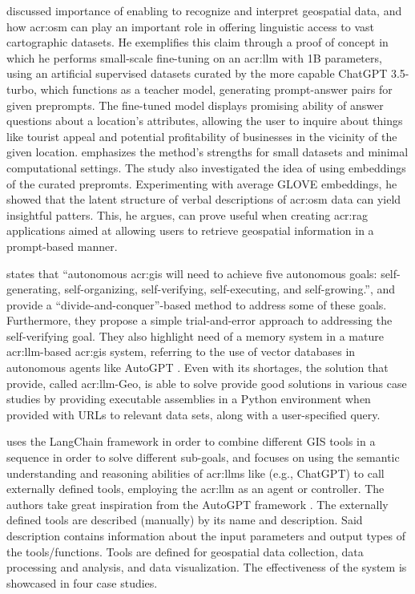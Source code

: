\cite{unluChatmapLargeLanguage2023} discussed importance of enabling  to recognize and interpret geospatial data, and how \gls{acr:osm} can play an important role in offering  linguistic access to vast cartographic datasets. He exemplifies this claim through a proof of concept in which he performs small-scale fine-tuning on an \acrshort{acr:llm} with 1B parameters, using an artificial supervised datasets curated by the more capable ChatGPT 3.5-turbo, which functions as a teacher model, generating prompt-answer pairs for given preprompts. The fine-tuned model displays promising ability of answer questions about a location's attributes, allowing the user to inquire about things like tourist appeal and potential profitability of businesses in the vicinity of the given location. \citeauthor{unluChatmapLargeLanguage2023} emphasizes the method's strengths for small datasets and minimal computational settings. The study also investigated the idea of using embeddings of the curated prepromts. Experimenting with average GLOVE embeddings, he showed that the latent structure of verbal descriptions of \gls{acr:osm} data can yield insightful patters. This, he argues, can prove useful when creating \acrfull{acr:rag} applications aimed at allowing users to retrieve geospatial information in a prompt-based manner.

\cite{liAutonomousGISNextgeneration2023} states that “autonomous \acrshort{acr:gis} will need to achieve five autonomous goals: self-generating, self-organizing, self-verifying, self-executing, and self-growing.”, and provide a “divide-and-conquer”-based method to address some of these goals. Furthermore, they propose a simple trial-and-error approach to addressing the self-verifying goal. They also highlight need of a memory system in a mature \gls{acr:llm}-based \gls{acr:gis} system, referring to the use of vector databases in autonomous agents like AutoGPT \citep{richardAutoGPTHeartOpensource2023}. Even with its shortages, the solution that \citep{liAutonomousGISNextgeneration2023} provide, called \acrshort{acr:llm}-Geo, is able to solve provide good solutions in various case studies by providing executable assemblies in a Python environment when provided with URLs to relevant data sets, along with a user-specified query.

\cite{zhangGeoGPTUnderstandingProcessing2023} uses the LangChain framework \citep{chaseLangChain2022} in order to combine different GIS tools in a sequence in order to solve different sub-goals, and focuses on using the semantic understanding and reasoning abilities of \glspl{acr:llm} like (e.g., ChatGPT) to call externally defined tools, employing the \gls{acr:llm} as an agent or controller. The authors take great inspiration from the AutoGPT framework \citep{richardAutoGPTHeartOpensource2023}. The externally defined tools are described (manually) by its name and description. Said description contains information about the input parameters and output types of the tools/functions. Tools are defined for geospatial data collection, data processing and analysis, and data visualization. The effectiveness of the system is showcased in four case studies.

